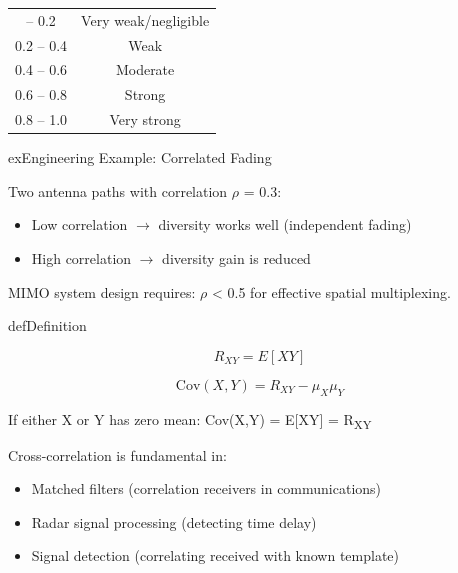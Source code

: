 
{\def\LTcaptype{none} %
\begin{longtable}[c]{@{}cc@{}}
\toprule\noalign{}
\rowcolor{PSnavy}& \PSth{\ensuremath{\rho}} \\
\midrule\noalign{}
\endhead
\bottomrule\noalign{}
\endlastfoot
0.0 – 0.2 & Very weak/negligible \\
0.2 – 0.4 & Weak \\
0.4 – 0.6 & Moderate \\
0.6 – 0.8 & Strong \\
0.8 – 1.0 & Very strong \\
\end{longtable}
}

\begin{PSbox}[unbreakable]{ex}{Engineering Example: Correlated Fading}

Two antenna paths with correlation \ensuremath{\rho} = 0.3:

\begin{itemize}
\tightlist
\item
  Low correlation \ensuremath{\to} diversity works well (independent fading)
\item
  High correlation \ensuremath{\to} diversity gain is reduced
\end{itemize}

MIMO system design requires: \ensuremath{\rho} \textless{} 0.5 for effective spatial multiplexing.

\end{PSbox}


\begin{PSbox}[unbreakable]{def}{Definition}

\[R_{XY} = E[XY]\]

\end{PSbox}


\[\text{Cov}(X,Y) = R_{XY} - \mu_X \mu_Y\]

If either X or Y has zero mean: Cov(X,Y) = E[XY] = R\textsubscript{XY}


Cross-correlation is fundamental in:

\begin{itemize}
\tightlist
\item
  Matched filters (correlation receivers in communications)
\item
  Radar signal processing (detecting time delay)
\item
  Signal detection (correlating received with known template)
\end{itemize}


